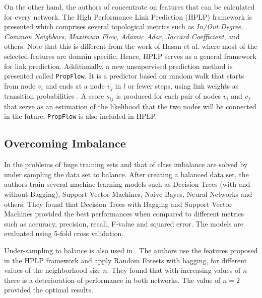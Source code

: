 \documentclass{acm_proc_article-sp}
\begin{document}
On the other hand, the authors of \cite{Lichtenwalter:2010:NPM:1835804.1835837} concentrate on features that can be calculated for every network. The High Performance Link Prediction (HPLP) framework is presented which comprises several topological metrics such as \textit{In/Out Degree}, \textit{Common Neighbors}, \textit{Maximum Flow}, \textit{Adamic Adar}, \textit{Jaccard Coefficient}, and others. Note that this is different from the work of Hasan et al. \cite{Hasan06linkprediction} where most of the selected features are domain specific. Hence, HPLP serves as a general framework for link prediction. Additionally, a new unsupervised prediction method is presented called \texttt{PropFlow}. It is a predictor based on random walk that starts from node $v_i$ and ends at a node $v_j$ in $l$ or fewer steps, using link weights as transition probabilities \cite{Lichtenwalter:2010:NPM:1835804.1835837}. A score $s_{ij}$ is produced for each pair of nodes $v_i$ and $v_j$ that serve as an estimation of the likelihood that the two nodes will be connected in the future. \texttt{PropFlow} is also included in HPLP.


\subsection{Overcoming Imbalance}

In \cite{Hasan06linkprediction} the problems of huge training sets and that of class imbalance are solved by under sampling the data set to balance. After creating a balanced data set, the authors train several machine learning models such as Decision Trees (with and without Bagging), Support Vector Machines, Naive Bayes, Neural Networks and others. They found that Decision Trees with Bagging and Support Vector Machines provided the best performances when compared to different metrics such as accuracy, precision, recall, F-value and squared error. The models are evaluated using 5-fold cross validation.

Under-sampling to balance is also used in \cite{Lichtenwalter:2010:NPM:1835804.1835837}. The authors use the features proposed in the HPLP framework and apply Random Forests with bagging, for different values of the neighborhood size $n$. They found that with increasing values of $n$ there is a deterioration of performance in both networks. The value of $n=2$ provided the optimal results.
 
\end{document}
